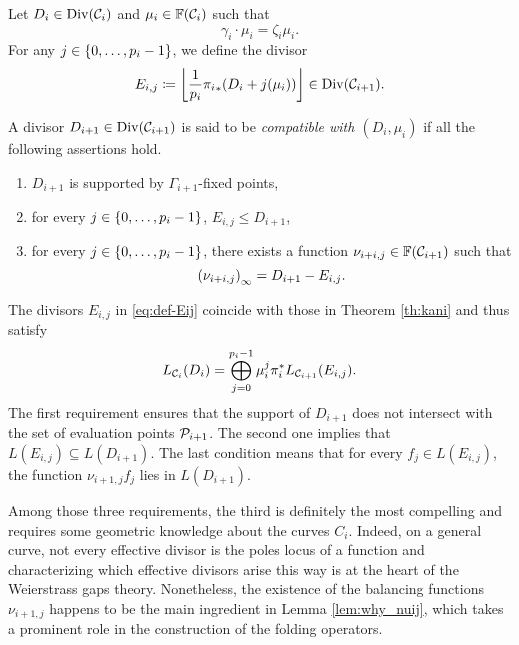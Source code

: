 \documentclass[10pt]{article}
\begin{document}
\begin{definition}\label{def-div_compatible}
	Let $D_i \in \operatorname{Div}(\mathcal{C}_i)$ and $\mu_i \in \mathbb{F}(\mathcal{C}_i)$ such that 
	\begin{equation}\label{eq:def-mu_i}
		\gamma_i \cdot \mu_i = \zeta_i \mu_i.
	\end{equation} For any $j \in \left\{0,\dots,p_i-1\right\}$, we define the divisor 
	\begin{equation}\label{eq:def-Eij}
		E_{i,j}\coloneqq \left\lfloor\frac{1}{p_i}{\pi_i}_*( D_i + j(\mu_i))\right\rfloor \in \operatorname{Div}(\mathcal{C}_{i+1}).
	\end{equation}
	
	A divisor $D_{i+1} \in \operatorname{Div}(\mathcal{C}_{i+1})$ is said to be \emph{compatible with $(D_i,\mu_i)$} if all the following assertions hold.
	\begin{enumerate}
		\item $D_{i+1}$ is supported by $\Gamma_{i+1}$-fixed points, 
		\item for every $j \in \left\{0,\dots,p_i-1\right\}$, $E_{i,j} \leq D_{i+1}$,
		\item  for every $j \in \left\{0,\dots,p_i-1\right\}$, there exists a function $\nu_{i+i,j}\in \mathbb{F}(\mathcal{C}_{i+1})$ such that
		\begin{equation}\label{eq:def-nu_i,j}
			\left( \nu_{i+i,j} \right)_\infty=D_{i+1} - E_{i,j}.	
		\end{equation}
	\end{enumerate}
\end{definition}


The divisors $E_{i,j}$ in \eqref{eq:def-Eij} coincide with those in Theorem \ref{th:kani} and thus satisfy
\begin{equation}\label{eq:decomposition}
	L_{\mathcal{C}_i}(D_i)= \bigoplus_{j=0}^{p_i-1} \mu_i^j \pi_i^* L_{\mathcal{C}_{i+1}}(E_{i,j}).
\end{equation}
The first requirement ensures that the support of $D_{i+1}$ does not intersect with the set of evaluation points $\mathcal{P}_{i+1}$. The second one implies that $L(E_{i,j}) \subseteq L(D_{i+1})$. The last condition means that for every $f_j \in L(E_{i,j})$, the function $\nu_{i+1, j}f_j$ lies in $L(D_{i+1})$.

Among those three requirements, the third is definitely the most compelling and requires some geometric knowledge about the curves $C_i$. Indeed, on a general curve, not every effective divisor is the poles locus of a function and characterizing which effective divisors arise this way is at the heart of the Weierstrass gaps theory. Nonetheless, the existence of the balancing functions $\nu_{i+1,j}$ happens to be the main ingredient in Lemma \ref{lem:why_nuij}, which takes a prominent role in the construction of the folding operators.
\end{document}
